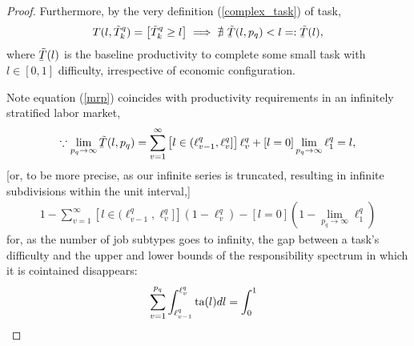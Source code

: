 \documentclass[hidelinks, nonatbib]{elsarticle}
\begin{document}
\begin{lemma}
\begin{proof}
        Furthermore, by the very definition (\ref{complex_task}) of task,
        \begin{gather}
            \label{mrp}
            T(l, \tilde{T}_{k}^{q}) = 
            \left[
                \tilde{T}_{k}^{q}
                \geq
                l
            \right]
            \implies
            \nexists \
            \underaccent{\bar}{\tilde{T}}(l, p_q)
            <
            l
            =:
            \underaccent{\bar}{\tilde{T}}(l)
            ,
        \end{gather}
        where $\underaccent{\bar}{\tilde{T}}(l)$ is the baseline productivity to complete some small task with $l \in [0,1]$ difficulty, irrespective of economic configuration.
        
        Note equation (\ref{mrp}) coincides with productivity requirements in an infinitely stratified labor market,
        \begin{gather}
            \because
            \lim_{p_q \rightarrow \infty}{
                \underaccent{\bar}{\tilde{T}}(l, p_q)
            }
            =
            \sum_{v=1}^{\infty}\left[
                l \in (
                    \ell_{v-1}^{q}
                    ,\ell_{v}^{q}
                ]
            \right]
            \ell_{v}^{q}
            +
            [l = 0]
            \lim_{p_q \rightarrow \infty}{
                \ell_{1}^{q}
            }
            =
            l
            ,
        \end{gather}
        [or, to be more precise, as our infinite series is truncated, resulting in infinite subdivisions within the unit interval,]
        \begin{gather}
            1
            -
            \sum_{v=1}^{\infty}\left[
                l \in (
                    \ell_{v-1}^{q}
                    ,\ell_{v}^{q}
                ]
            \right]
            (1 - \ell_{v}^{q})
            -
            [l = 0]\left(
                1 - 
                \lim_{p_q \rightarrow \infty}{
                    \ell_{1}^{q}
                }
            \right)
        \end{gather}
        for, as the number of job subtypes goes to infinity, the gap between a task's difficulty and the upper and lower bounds of the responsibility spectrum in which it is cointained disappears:
        \begin{align}
            &
            \sum_{v=1}^{p_q}
            \int_{\ell_{v-1}^{q}}^{\ell_{v}^{q}}
            \ta(l)dl
            =
            \int_{0}^{1}

\end{align}
\end{proof}
\end{lemma}
\end{document}
